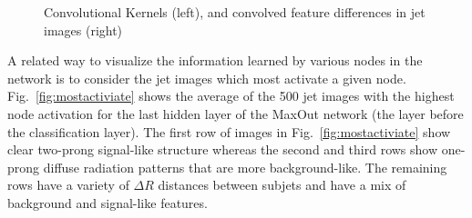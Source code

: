 \begin{figure}[bt]
  \begin{center}
      \caption{Convolutional Kernels (left), and convolved feature differences in jet images (right)}
      \label{fig:convkernels}

    \end{center}
\end{figure}

A related way to visualize the information learned by various nodes in the network is to consider the jet images which most activate a given node.  Fig.~\ref{fig:mostactiviate} shows the average of the 500 jet images with the highest node activation  for the last hidden layer of the MaxOut network (the layer before the classification layer).  The first row of images in Fig.~\ref{fig:mostactiviate} show clear two-prong signal-like structure whereas the second and third rows show one-prong diffuse radiation patterns that are more background-like.  The remaining rows have a variety of $\Delta R$ distances between subjets and have a mix of background and signal-like features.


